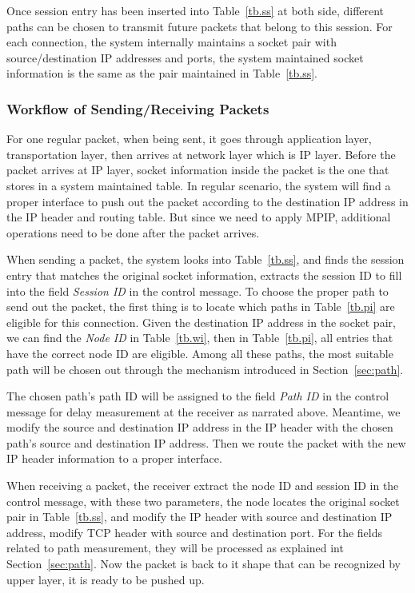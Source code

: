 Once session entry has been inserted into Table~\ref{tb.ss} at both side, different paths can be chosen to transmit future packets that belong to this session. For each connection, the system internally maintains a socket pair with source/destination IP addresses and ports, the system maintained socket information is the same as the pair maintained in Table~\ref{tb.ss}. 

\subsubsection{Workflow of Sending/Receiving Packets}

For one regular packet, when being sent, it goes through application layer, transportation layer, then arrives at network layer which is IP layer. Before the packet arrives at IP layer, socket information inside the packet is the one that stores in a system maintained table. In regular scenario, the system will find a proper interface to push out the packet according to the destination IP address in the IP header and routing table. But since we need to apply MPIP, additional operations need to be done after the packet arrives.

When sending a packet, the system looks into Table~\ref{tb.ss}, and finds the session entry that matches the original socket information, extracts the session ID to fill into the field \emph{Session ID} in the control message. To choose the proper path to send out the packet, the first thing is to locate which paths in Table~\ref{tb.pi} are eligible for this connection. Given the destination IP address in the socket pair, we can find the \emph{Node ID} in Table~\ref{tb.wi}, then in Table~\ref{tb.pi}, all entries that have the correct node ID are eligible. Among all these paths, the most suitable path will be chosen out through the mechanism introduced in Section~\ref{sec:path}. 

The chosen path\textquoteright s path ID will be assigned to the field \emph{Path ID} in the control message for delay measurement at the receiver as narrated above. Meantime, we modify the source and destination IP address in the IP header with the chosen path\textquoteright s source and destination IP address. Then we route the packet with the new IP header information to a proper interface.

When receiving a packet, the receiver extract the node ID and session ID in the control message, with these two parameters, the node locates the original socket pair in Table~\ref{tb.ss}, and modify the IP header with source and destination IP address, modify TCP header with source and destination port. For the fields related to path measurement, they will be processed as explained int Section~\ref{sec:path}. Now the packet is back to it shape that can be recognized by upper layer, it is ready to be pushed up.

